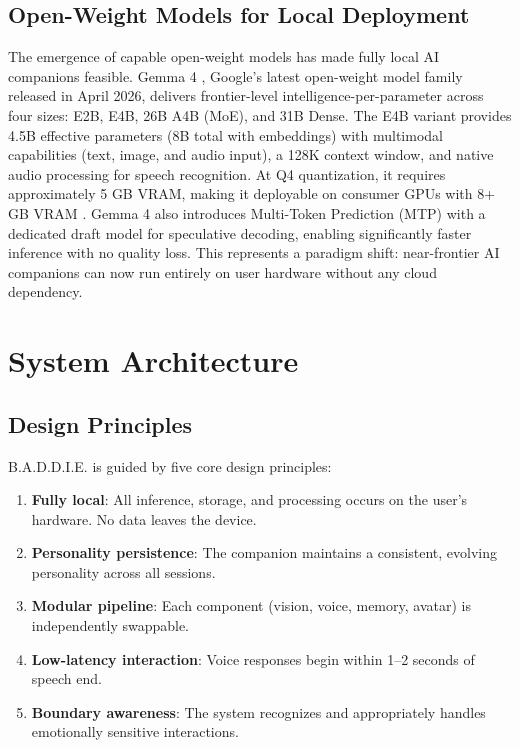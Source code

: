 \documentclass[sigconf]{acmart}
\begin{document}
\subsection{Open-Weight Models for Local Deployment}

The emergence of capable open-weight models has made fully local AI companions feasible. Gemma 4 \cite{gemma4modelcard, gemma4blog}, Google's latest open-weight model family released in April 2026, delivers frontier-level intelligence-per-parameter across four sizes: E2B, E4B, 26B A4B (MoE), and 31B Dense. The E4B variant provides 4.5B effective parameters (8B total with embeddings) with multimodal capabilities (text, image, and audio input), a 128K context window, and native audio processing for speech recognition. At Q4 quantization, it requires approximately 5 GB VRAM, making it deployable on consumer GPUs with 8+ GB VRAM \cite{gemma4modelcard}. Gemma 4 also introduces Multi-Token Prediction (MTP) with a dedicated draft model for speculative decoding, enabling significantly faster inference with no quality loss. This represents a paradigm shift: near-frontier AI companions can now run entirely on user hardware without any cloud dependency.

\section{System Architecture}

\subsection{Design Principles}

B.A.D.D.I.E. is guided by five core design principles:

\begin{enumerate}
    \item \textbf{Fully local}: All inference, storage, and processing occurs on the user's hardware. No data leaves the device.
    \item \textbf{Personality persistence}: The companion maintains a consistent, evolving personality across all sessions.
    \item \textbf{Modular pipeline}: Each component (vision, voice, memory, avatar) is independently swappable.
    \item \textbf{Low-latency interaction}: Voice responses begin within 1--2 seconds of speech end.
    \item \textbf{Boundary awareness}: The system recognizes and appropriately handles emotionally sensitive interactions.
\end{enumerate}
\end{document}
